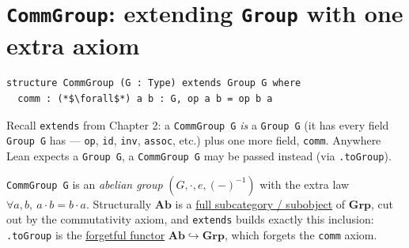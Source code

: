 \section{\texorpdfstring{\texttt{CommGroup}: extending \texttt{Group} with one extra axiom}{CommGroup: extending Group with one extra axiom}}\label{sec:08-rings:02-comm-group:1}

\begin{lstlisting}
structure CommGroup (G : Type) extends Group G where
  comm : (*$\forall$*) a b : G, op a b = op b a
\end{lstlisting}

Recall \texttt{extends} from Chapter 2: a \texttt{CommGroup G} \emph{is} a \texttt{Group G} (it has every field \texttt{Group G} has --- \texttt{op}, \texttt{id}, \texttt{inv}, \texttt{assoc}, etc.) plus one more field, \texttt{comm}. Anywhere Lean expects a \texttt{Group G}, a \texttt{CommGroup G} may be passed instead (via \texttt{.toGroup}).

\begin{mathreading}

\texttt{CommGroup G} is an \emph{abelian group} \((G, \cdot, e,
(-)^{-1})\) with the extra law \(\forall a,b,\ a\cdot b = b\cdot a\). Structurally \(\mathbf{Ab}\) is a \hyperref[sec:01-basics:04-terminology:1]{full subcategory / subobject} of \(\mathbf{Grp}\), cut out by the commutativity axiom, and \texttt{extends} builds exactly this inclusion: \texttt{.toGroup} is the \hyperref[sec:01-basics:04-terminology:1]{forgetful functor} \(\mathbf{Ab} \hookrightarrow \mathbf{Grp}\), which forgets the \texttt{comm} axiom.

\end{mathreading}
